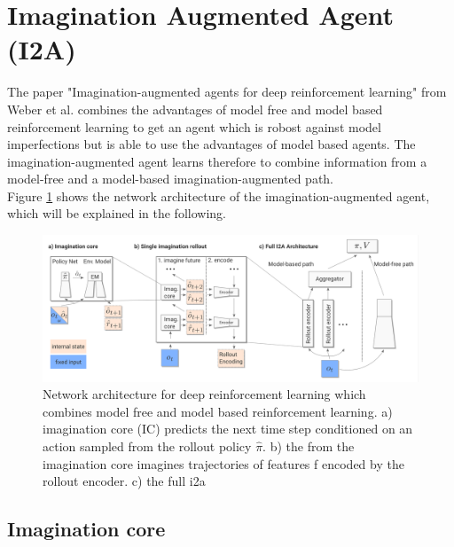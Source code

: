 \section{Imagination Augmented Agent (I2A)} 
\label{sec:i2a} 
 
The paper "Imagination-augmented agents for deep reinforcement learning" from Weber et al. \cite{I2A} combines the advantages of model free and model based reinforcement learning to get an agent which is robost against model imperfections but is able to use the advantages of model based agents.
The imagination-augmented agent learns therefore to combine information from a model-free and a model-based imagination-augmented path.\\

 
Figure \ref{fig:i2a_architecture} shows the network architecture of the imagination-augmented agent, which will be explained in the following.

\begin{figure}[H] 
  \centering 
   
  \includegraphics[width=\columnwidth]{./Images/i2a_architecture.png} 
  \caption{Network architecture for deep reinforcement learning which combines model free and model based reinforcement learning. a) imagination core (IC) predicts the next time step conditioned on an action sampled from the rollout policy $\hat{\pi}$. b) the from the imagination core imagines trajectories of features f encoded by the rollout encoder. c) the full i2a} 
  \label{fig:i2a_architecture} 
\end{figure} 
 
\subsection{Imagination core}

